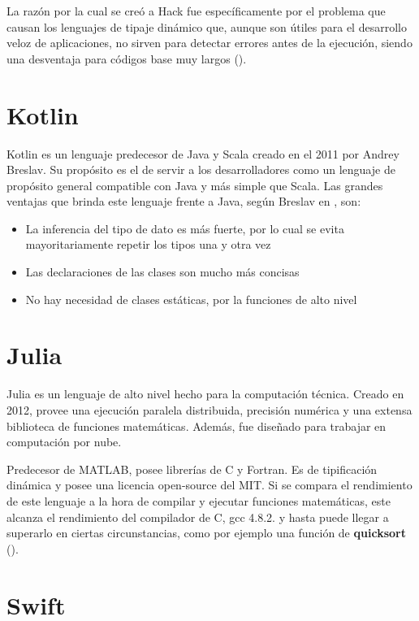 \documentclass[a4paper,11pt]{article}
\begin{document}
La razón por la cual se creó a Hack fue específicamente por el problema que causan los lenguajes de tipaje dinámico que, aunque son útiles para el desarrollo veloz de aplicaciones, no sirven para detectar errores antes de la ejecución, siendo una desventaja para códigos base muy largos (\cite{Menghrajani}).

\section{Kotlin}

Kotlin es un lenguaje predecesor de Java y Scala creado en el 2011 por Andrey Breslav. Su propósito es el de servir a los desarrolladores como un lenguaje de propósito general compatible con Java y más simple que Scala. Las grandes ventajas que brinda este lenguaje frente a Java, según Breslav en \cite{Heiss}, son:
\begin{itemize}
  \item La inferencia del tipo de dato es más fuerte, por lo cual se evita mayoritariamente repetir los tipos una y otra vez
  \item Las declaraciones de las clases son mucho más concisas
  \item No hay necesidad de clases estáticas, por la funciones de alto nivel
\end{itemize}

\section{Julia}

Julia es un lenguaje de alto nivel hecho para la computación técnica. Creado en 2012, provee una ejecución paralela distribuida, precisión numérica y una extensa biblioteca de funciones matemáticas. Además, fue diseñado para trabajar en computación por nube.

Predecesor de MATLAB, posee librerías de C y Fortran. Es de tipificación dinámica y posee una licencia open-source del MIT. Si se compara el rendimiento de este lenguaje a la hora de compilar y ejecutar funciones matemáticas, este alcanza el rendimiento del compilador de C, gcc 4.8.2. y hasta puede llegar a superarlo en ciertas circunstancias, como por ejemplo una función de \textbf{quicksort} (\cite{Julia}).

\section{Swift}
\end{document}
